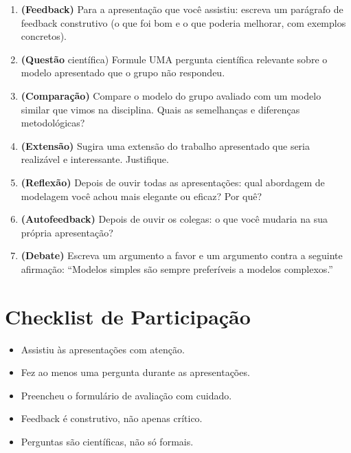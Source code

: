 \documentclass[12pt,a4paper]{article}
\begin{document}
\begin{enumerate}
  \item \textbf{(Feedback)} Para a apresenta\c{c}\~ao que voc\^e assistiu: escreva um par\'agrafo de feedback construtivo (o que foi bom e o que poderia melhorar, com exemplos concretos).
  
  \item \textbf{(Quest\~ao} cient\'ifica) Formule UMA pergunta cient\'ifica relevante sobre o modelo apresentado que o grupo n\~ao respondeu.
  
  \item \textbf{(Compara\c{c}\~ao)} Compare o modelo do grupo avaliado com um modelo similar que vimos na disciplina. Quais as semelhan\c{c}as e diferen\c{c}as metodol\'ogicas?
  
  \item \textbf{(Extens\~ao)} Sugira uma extens\~ao do trabalho apresentado que seria realiz\'avel e interessante. Justifique.
  
  \item \textbf{(Reflex\~ao)} Depois de ouvir todas as apresenta\c{c}\~oes: qual abordagem de modelagem voc\^e achou mais elegante ou eficaz? Por qu\^e?
  
  \item \textbf{(Autofeedback)} Depois de ouvir os colegas: o que voc\^e mudaria na sua pr\'opria apresenta\c{c}\~ao?
  
  \item \textbf{(Debate)} Escreva um argumento a favor e um argumento contra a seguinte afirma\c{c}\~ao: ``Modelos simples s\~ao sempre prefer\'iveis a modelos complexos.''
\end{enumerate}

\section*{Checklist de Participa\c{c}\~ao}
\begin{itemize}
  \item[$\square$] Assistiu \`as apresenta\c{c}\~oes com aten\c{c}\~ao.
  \item[$\square$] Fez ao menos uma pergunta durante as apresenta\c{c}\~oes.
  \item[$\square$] Preencheu o formul\'ario de avalia\c{c}\~ao com cuidado.
  \item[$\square$] Feedback \'e construtivo, n\~ao apenas cr\'itico.
  \item[$\square$] Perguntas s\~ao cient\'ificas, n\~ao s\'o formais.
\end{itemize}
\end{document}
